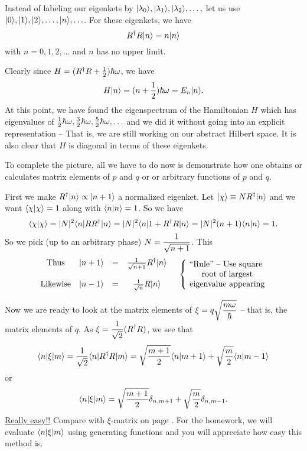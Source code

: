 Instead of labeling our eigenkets by $|\lambda_0\rangle, |\lambda_1\rangle, |\lambda_2\rangle, \hdots,$ let us use $|0\rangle, |1\rangle, |2\rangle, \hdots, |n\rangle, \hdots$. For these eigenkets, we have
$$R^\dagger R|n\rangle = n |n\rangle$$ with $n = 0,1,2,\hdots$ and $n$ has no upper limit. 

Clearly since $H= (R^\dagger R + {1\over2})\hbar\omega$, we have
$$H|n\rangle = (n+{1\over2}) \hbar\omega = E_n|n\rangle.$$
At this point, we have found the eigenspectrum of the Hamiltonian $H$ which has eigenvalues of ${1\over2}\hbar\omega, {3\over2}\hbar\omega, {5\over2}\hbar\omega,\hdots$ and we did it without
going into an explicit representation -- That is, we are still working on our abstract Hilbert space. It is also clear that $H$ is diagonal in terms of these eigenkets. 

To complete the picture, all we have to do now is demonstrate how one obtains or calculates matrix elements of $p$ and $q$ or or arbitrary functions of $p$ and $q$.

First we make $R^\dagger |n\rangle \propto |n+1\rangle$ a normalized eigenket. Let $|\chi\rangle\equiv NR^\dagger|n\rangle$ and we want $\langle \chi|\chi\rangle = 1$ along with 
$\langle n|n\rangle = 1$. So we have
$$\langle \chi|\chi\rangle = |N|^2\langle n| RR^\dagger| n \rangle = |N|^2 \langle n| 1 + R^\dagger R| n \rangle = |N|^2(n+1)\langle n|n\rangle = 1.$$
So we pick (up to an arbitrary phase) $\displaystyle N = {1\over\sqrt{n+1}}$. This
$$\begin{matrix}
\mbox{Thus}     & |n+1\rangle &=& {1\over\sqrt{n+1}}R^\dagger |n\rangle\\ \\ 
\mbox{Likewise} &|n-1\rangle &=& {1\over\sqrt{n}}R|n\rangle 
\end{matrix}~~~~
\left\{\begin{matrix}
\mbox{~``Rule'' -- Use square  }\\ 
\mbox{~root of largest}\\
\mbox{~eigenvalue appearing} 
\end{matrix}\right. $$

Now we are ready to look at the matrix elements of $\displaystyle \xi = q\sqrt{{m\omega\over\hbar}}$ -- that is, the matrix elements of $q$. 
As $\displaystyle \xi = {1\over\sqrt{2}}(R^\dagger R)$, we see that 
$$\langle n| \xi| m \rangle = {1\over\sqrt{2}}\langle n| R^\dagger R| m \rangle = \sqrt{m+1\over2}\langle n|m+1\rangle + \sqrt{m\over2}\langle n|m-1\rangle$$ or 
$$\langle n| \xi| m \rangle = \sqrt{m+1\over2}\delta_{n,m+1} + \sqrt{m\over2}\delta_{n, m-1}.$$ \underline{Really easy!!} Compare with $\xi$-matrix on page . 
For the homework, we will evaluate $\langle n| \xi| m \rangle$ using generating functions and you will appreciate how easy this method is.

